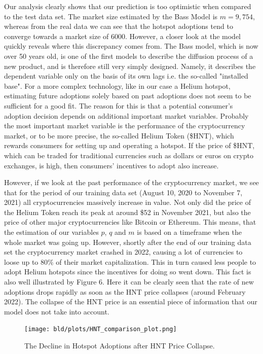 \documentclass{article}
\begin{document}
Our analysis clearly shows that our prediction is too optimistic when compared to the test data set. The market size estimated by the Bass Model is $m = 9,754$, whereas
from the real data we can see that the hotspot adoptions tend to converge towards a market size of $6000$. However, a closer look at the model quickly reveals where
this discrepancy comes from. The Bass model, which is now over 50 years old, is one of the first models to describe the diffusion process of a new product, and is
therefore still very simply designed. Namely, it describes the dependent variable only on the basis of its own lags i.e. the so-called "installed base". For a more
complex technology, like in our case a Helium hotspot, estimating future adoptions solely based on past adoptions does not seem to be sufficient for a good fit.
The reason for this is that a potential consumer's adoption decision depends on additional important market variables. Probably the most important market variable
is the performance of the cryptocurrency market, or to be more precise, the so-called Helium Token (\$HNT), which rewards consumers for setting up and operating a
hotspot. If the price of \$HNT, which can be traded for traditional currencies such as dollars or euros on crypto exchanges, is high, then consumers'
incentives to adopt also increase. 

\bigskip

\noindent However, if we look at the past performance of the cryptocurrency market, we see that for the period of our training data set (August 10, 2020 to November 7, 2021) all
cryptocurrencies massively increase in value. Not only did the price of the Helium Token reach its peak at around \$52 in November 2021, but also the price of other major
cryptocurrencies like Bitcoin or Ethereum. This means, that the estimation of our variables $p$, $q$ and $m$ is based on a timeframe when the whole market was going up. However,
shortly after the end of our training data set the cryptocurrency market crashed in 2022, causing a lot of currencies to loose up to 80\% of their market capitalization. This in
turn caused less people to adopt Helium hotspots since the incentives for doing so went down. This fact is also well illustrated by Figure 6. Here it can be clearly seen that the
rate of new adoptions drops rapidly as soon as the HNT price collapses (around February 2022). The collapse of the HNT price is an essential piece of information that our model
does not take into account.

\begin{figure}[!hptb]
    \centering{}\texttt{[image: bld/plots/HNT\_comparison\_plot.png]}\\
    \caption{The Decline in Hotspot Adoptions after HNT Price Collapse.}
\end{figure}
\end{document}
